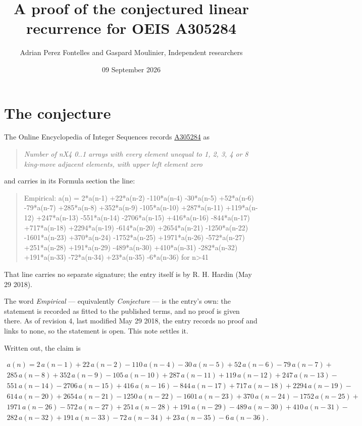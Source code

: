 \documentclass[11pt]{article}
\title{A proof of the conjectured linear recurrence for OEIS A305284}
\author{Adrian Perez Fontelles and Gaspard Moulinier, Independent researchers}
\date{09 September 2026}
\theoremstyle{definition}
\begin{document}
\maketitle
\section{The conjecture}

The Online Encyclopedia of Integer Sequences records \href{https://oeis.org/A305284}{A305284} as

\begin{quote}\itshape Number of nX4 0..1 arrays with every element unequal to 1, 2, 3, 4 or 8 king-move adjacent elements, with upper left element zero\end{quote}

and carries in its Formula section the line:

\begin{quote}\ttfamily Empirical: a(n) = 2*a(n-1) +22*a(n-2) -110*a(n-4) -30*a(n-5) +52*a(n-6) -79*a(n-7) +285*a(n-8) +352*a(n-9) -105*a(n-10) +287*a(n-11) +119*a(n-12) +247*a(n-13) -551*a(n-14) -2706*a(n-15) +416*a(n-16) -844*a(n-17) +717*a(n-18) +2294*a(n-19) -614*a(n-20) +2654*a(n-21) -1250*a(n-22) -1601*a(n-23) +370*a(n-24) -1752*a(n-25) +1971*a(n-26) -572*a(n-27) +251*a(n-28) +191*a(n-29) -489*a(n-30) +410*a(n-31) -282*a(n-32) +191*a(n-33) -72*a(n-34) +23*a(n-35) -6*a(n-36) for n>41\end{quote}

That line carries no separate signature; the entry itself is by R. H. Hardin (May 29 2018).

The word {\itshape Empirical} --- equivalently {\itshape Conjecture} --- is the entry's own: the statement is recorded as fitted to the published terms, and no proof is given there. As of revision 4, last modified May 29 2018, the entry records no proof and links to none, so the statement is open. This note settles it.

Written out, the claim is

\begin{multline*} a(n) = 2\,a(n-1) + 22\,a(n-2) - 110\,a(n-4) - 30\,a(n-5) + 52\,a(n-6) - 79\,a(n-7) + \\ 285\,a(n-8) + 352\,a(n-9) - 105\,a(n-10) + 287\,a(n-11) + 119\,a(n-12) + 247\,a(n-13) - \\ 551\,a(n-14) - 2706\,a(n-15) + 416\,a(n-16) - 844\,a(n-17) + 717\,a(n-18) + 2294\,a(n-19) - \\ 614\,a(n-20) + 2654\,a(n-21) - 1250\,a(n-22) - 1601\,a(n-23) + 370\,a(n-24) - 1752\,a(n-25) + \\ 1971\,a(n-26) - 572\,a(n-27) + 251\,a(n-28) + 191\,a(n-29) - 489\,a(n-30) + 410\,a(n-31) - \\ 282\,a(n-32) + 191\,a(n-33) - 72\,a(n-34) + 23\,a(n-35) - 6\,a(n-36). \end{multline*}
\end{document}
